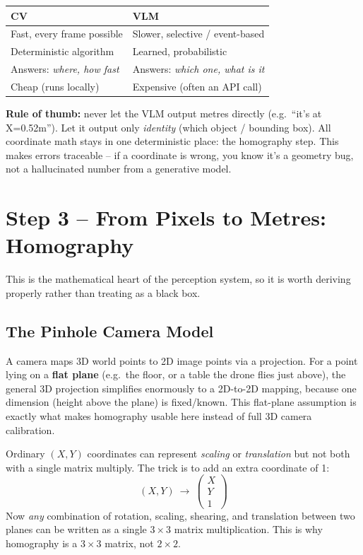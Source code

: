 \documentclass[11pt,a4paper]{article}
\begin{document}
\begin{center}
\small
\begin{tabular}{ll}
\toprule
\textbf{CV} & \textbf{VLM} \\
\midrule
Fast, every frame possible & Slower, selective / event-based \\
Deterministic algorithm & Learned, probabilistic \\
Answers: \emph{where, how fast} & Answers: \emph{which one, what is it} \\
Cheap (runs locally) & Expensive (often an API call) \\
\bottomrule
\end{tabular}
\end{center}

\begin{quotebox}
\textbf{Rule of thumb:} never let the VLM output metres directly (e.g.\ ``it's at X=0.52m'').
Let it output only \emph{identity} (which object / bounding box). All coordinate math stays in
one deterministic place: the homography step. This makes errors traceable -- if a coordinate is
wrong, you know it's a geometry bug, not a hallucinated number from a generative model.
\end{quotebox}

\section{Step 3 -- From Pixels to Metres: Homography}
\label{sec:homography}

This is the mathematical heart of the perception system, so it is worth deriving properly rather
than treating as a black box.

\subsection{The Pinhole Camera Model}

A camera maps 3D world points to 2D image points via a projection. For a point lying on a
\textbf{flat plane} (e.g.\ the floor, or a table the drone flies just above), the general 3D
projection simplifies enormously to a 2D-to-2D mapping, because one dimension (height above the
plane) is fixed/known. This flat-plane assumption is exactly what makes homography usable here
instead of full 3D camera calibration.

\begin{mathbox}[title={\textbf{Homogeneous coordinates (why we add a `1')}}]
Ordinary $(X,Y)$ coordinates can represent \emph{scaling} or \emph{translation} but not both with
a single matrix multiply. The trick is to add an extra coordinate of 1:
\[
(X, Y) \ \longrightarrow\ \begin{pmatrix} X \\ Y \\ 1 \end{pmatrix}
\]
Now \emph{any} combination of rotation, scaling, shearing, and translation between two planes can
be written as a single $3\times3$ matrix multiplication. This is why homography is a
$3\times 3$ matrix, not $2\times2$.
\end{mathbox}
\end{document}
